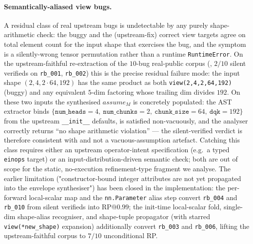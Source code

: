 \paragraph{Semantically-aliased view bugs.}
A residual class of real upstream bugs is undetectable by any
purely shape-arithmetic check: the buggy and the (upstream-fix)
correct view targets agree on total element count for the
input shape that exercises the bug, and the symptom is a
silently-wrong tensor permutation rather than a runtime
\texttt{RuntimeError}. On the upstream-faithful re-extraction of
the $10$-bug real-public corpus (,
$2/10$ silent verifieds on \texttt{rb\_001}, \texttt{rb\_002})
this is the precise residual failure mode: the input shape
$(2, 4, 2{\cdot}64, 192)$ has the same product as both
\texttt{view(2,4,2,64,192)} (buggy) and any equivalent
$5$-dim factoring whose trailing dim divides $192$. On these two
inputs the synthesised $\mathit{assume}_M$ is concretely populated:
the AST extractor binds
$\{\texttt{num\_heads}{=}4,\ \texttt{num\_chunks}{=}2,
 \ \texttt{chunk\_size}{=}64,\ \texttt{dqk}{=}192\}$ from the
upstream \texttt{\_\_init\_\_} defaults,
 is satisfied non-vacuously, and the analyser
correctly returns ``no shape arithmetic violation'' --- the
silent-verified verdict is therefore consistent with
 and not a vacuous-assumption artefact.
Catching this class requires either an upstream operator-intent
specification (e.g.\ a typed \texttt{einops} target) or an
input-distribution-driven semantic check; both are out of
scope for the static, no-execution refinement-type fragment we
analyse. The earlier limitation
("constructor-bound integer attributes are not yet propagated
into the envelope synthesiser") has been closed in the
implementation: the per-forward local-scalar map and the
\texttt{nn.Parameter} alias step convert
\texttt{rb\_004} and \texttt{rb\_010} from silent
verifieds into RP@$0.99$; the init-time local-scalar
fold, single-dim shape-alias recogniser, and shape-tuple
propagator (with starred \texttt{view(*new\_shape)}
expansion) additionally convert \texttt{rb\_003} and
\texttt{rb\_006}, lifting the upstream-faithful corpus to
$7/10$ unconditional RP.

